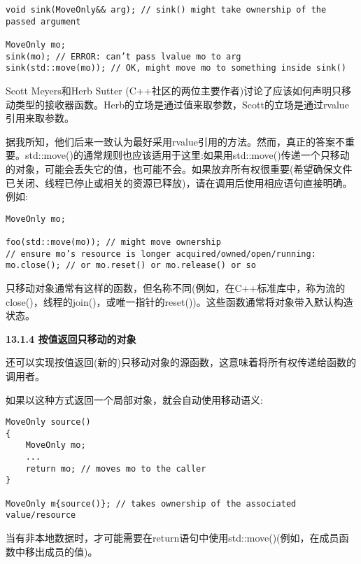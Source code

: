 \begin{lstlisting}[caption={}]
void sink(MoveOnly&& arg); // sink() might take ownership of the passed argument

MoveOnly mo;
sink(mo); // ERROR: can’t pass lvalue mo to arg
sink(std::move(mo)); // OK, might move mo to something inside sink()
\end{lstlisting}

Scott Meyers和Herb Sutter (C++社区的两位主要作者)讨论了应该如何声明只移动类型的接收器函数。Herb的立场是通过值来取参数，Scott的立场是通过rvalue引用来取参数。\par

据我所知，他们后来一致认为最好采用rvalue引用的方法。然而，真正的答案不重要。std::move()的通常规则也应该适用于这里:如果用std::move()传递一个只移动的对象，可能会丢失它的值，也可能不会。如果放弃所有权很重要(希望确保文件已关闭、线程已停止或相关的资源已释放)，请在调用后使用相应语句直接明确。例如:\par

\begin{lstlisting}[caption={}]
MoveOnly mo;

foo(std::move(mo)); // might move ownership
// ensure mo’s resource is longer acquired/owned/open/running:
mo.close(); // or mo.reset() or mo.release() or so
\end{lstlisting}

只移动对象通常有这样的函数，但名称不同(例如，在C++标准库中，称为流的close()，线程的join()，或唯一指针的reset())。这些函数通常将对象带入默认构造状态。\par

\hspace*{\fill} \par %
\textbf{13.1.4 按值返回只移动的对象}

还可以实现按值返回(新的)只移动对象的源函数，这意味着将所有权传递给函数的调用者。\par

如果以这种方式返回一个局部对象，就会自动使用移动语义:\par

\begin{lstlisting}[caption={}]
MoveOnly source()
{
	MoveOnly mo;
	...
	return mo; // moves mo to the caller
}

MoveOnly m{source()}; // takes ownership of the associated value/resource
\end{lstlisting}

当有非本地数据时，才可能需要在return语句中使用std::move()(例如，在成员函数中移出成员的值)。\par

